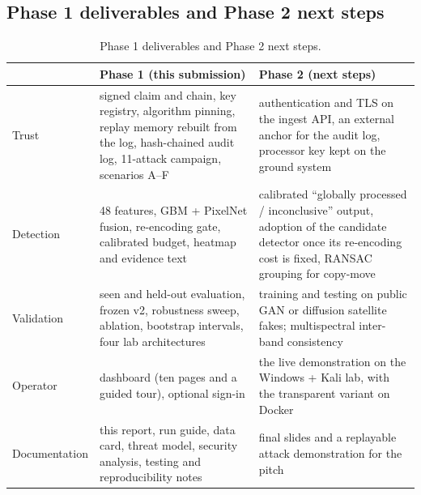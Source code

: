 \subsection{Phase 1 deliverables and Phase 2 next steps}
\begin{table}[!htbp]
\centering\small
\begin{tabularx}{\textwidth}{|L{2.4cm}|Y|Y|}
\hline
 & \textbf{Phase 1 (this submission)} & \textbf{Phase 2 (next steps)}\\
\hline
Trust & signed claim and chain, key registry, algorithm pinning, replay memory rebuilt from the log, hash-chained audit log, 11-attack campaign, scenarios A--F & authentication and TLS on the ingest API, an external anchor for the audit log, processor key kept on the ground system\\
\hline
Detection & 48 features, GBM + PixelNet fusion, re-encoding gate, calibrated budget, heatmap and evidence text & calibrated ``globally processed / inconclusive'' output, adoption of the candidate detector once its re-encoding cost is fixed, RANSAC grouping for copy-move\\
\hline
Validation & seen and held-out evaluation, frozen v2, robustness sweep, ablation, bootstrap intervals, four lab architectures & training and testing on public GAN or diffusion satellite fakes; multispectral inter-band consistency\\
\hline
Operator & dashboard (ten pages and a guided tour), optional sign-in & the live demonstration on the Windows + Kali lab, with the transparent variant on Docker\\
\hline
Documentation & this report, run guide, data card, threat model, security analysis, testing and reproducibility notes & final slides and a replayable attack demonstration for the pitch\\
\hline
\end{tabularx}
\caption{Phase 1 deliverables and Phase 2 next steps.}
\end{table}

